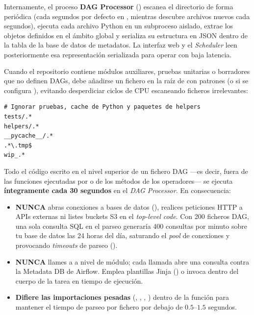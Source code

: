 Internamente, el proceso \textbf{DAG Processor} () escanea el directorio  de forma periódica (cada  segundos por defecto en , mientras  descubre archivos nuevos cada  segundos), ejecuta cada archivo Python en un subproceso aislado, extrae los objetos  definidos en el ámbito global y serializa su estructura en JSON dentro de la tabla  de la base de datos de metadatos. La interfaz web y el \textit{Scheduler} leen posteriormente esa representación serializada para operar con baja latencia.

Cuando el repositorio contiene módulos auxiliares, pruebas unitarias o borradores que no definen DAGs, debe añadirse un fichero  en la raíz de  con patrones  (o  si se configura ), evitando desperdiciar ciclos de CPU escaneando ficheros irrelevantes:

\begin{lstlisting}[style=bash, caption={Ejemplo de \code{.airflowignore} para excluir pruebas, utilidades compartidas y archivos temporales.}, label={lst:airflowignore}]
# Ignorar pruebas, cache de Python y paquetes de helpers
tests/.*
helpers/.*
__pycache__/.*
.*\.tmp$
wip_.*
\end{lstlisting}

\begin{warningbox}
Todo el código escrito en el nivel superior de un fichero DAG ---es decir, fuera de las funciones ejecutadas por  o de los métodos  de los operadores--- se ejecuta \textbf{íntegramente cada 30 segundos} en el \textit{DAG Processor}. En consecuencia:
\begin{itemize}
  \item \textbf{NUNCA} abras conexiones a bases de datos (), realices peticiones HTTP a APIs externas ni listes buckets S3 en el \textit{top-level code}. Con 200 ficheros DAG, una sola consulta SQL en el parseo generaría 400 consultas por minuto sobre tu base de datos las 24 horas del día, saturando el \textit{pool} de conexiones y provocando \textit{timeouts} de parseo ().
  \item \textbf{NUNCA} llames a  a nivel de módulo; cada llamada abre una consulta contra la Metadata DB de Airflow. Emplea plantillas Jinja () o invoca  dentro del cuerpo de la tarea en tiempo de ejecución.
  \item \textbf{Difiere las importaciones pesadas} (, , , ) dentro de la función  para mantener el tiempo de parseo por fichero por debajo de $0.5$--$1.5$ segundos.
\end{itemize}
\end{warningbox}

